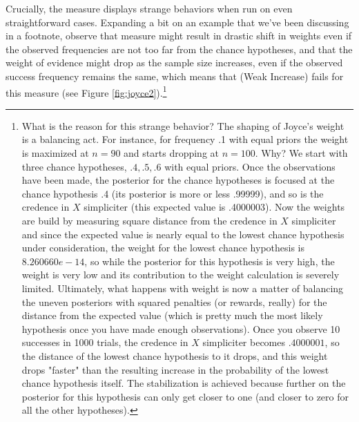 \documentclass[
  10pt,
  dvipsnames,enabledeprecatedfontcommands]{scrartcl}
\begin{document}
Crucially, the measure displays strange behaviors when run on even
straightforward cases. Expanding a bit on an example that we've been
discussing in a footnote, observe that measure might result in drastic
shift in weights even if the observed frequencies are not too far from
the chance hypotheses, and that the weight of evidence might drop as the
sample size increases, even if the observed success frequency remains
the same, which means that (Weak Increase) fails for this measure (see
Figure \ref{fig:joyce2}).\footnote{
What is the reason for this strange behavior? The shaping of Joyce's weight is a balancing act. For instance, for frequency .1 with equal priors the weight is maximized at $n=90$ and starts dropping at $n=100$. Why? We start with three chance hypotheses, $.4, .5, .6$ with equal priors. Once the observations have been made, the posterior for the chance hypotheses is focused at the chance hypothesis .4 (its posterior is more or less .99999), and so is the credence in $X$ simpliciter (this expected value is .4000003). Now the weights are build by measuring square distance from the credence in $X$ simpliciter and since the expected value is nearly equal to the lowest chance hypothesis under consideration, the weight for the lowest chance hypothesis is $8.260660e-14$, so while the posterior for this hypothesis is very high, the weight is very low and its contribution to the weight calculation is severely limited. Ultimately, what happens with weight is now a matter of balancing the uneven posteriors with squared penalties (or rewards, really) for the distance from the expected value (which is pretty much the most likely hypothesis once you have made enough observations). Once you observe 10 successes in 1000 trials, the credence in $X$ simpliciter becomes $.4000001$, so the distance of the lowest chance hypothesis to it drops, and this weight drops "faster" than the resulting increase in the probability of the lowest chance hypothesis itself. The stabilization is achieved because further on the posterior for this hypothesis can only get closer to one (and closer to zero for all the other hypotheses).}
\end{document}
